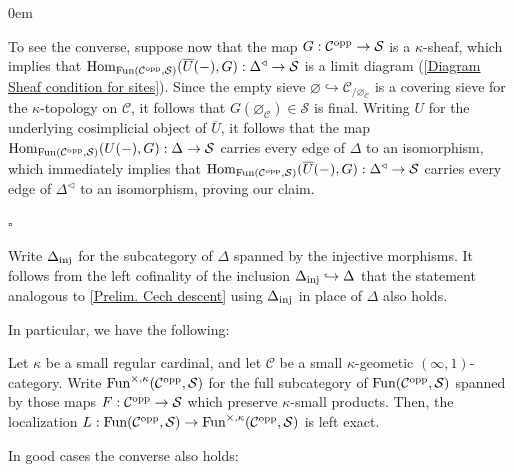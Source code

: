 \documentclass[10pt]{article}
\newcommand{\mS}{\mathcal S}
\newcommand{\C}{\mathcal C}
\renewcommand{\qed}{\hfill$\square$}
\renewenvironment{proof}{\begin{addmargin}[1em]{0em}\begin{newproof}}{\end{newproof}\end{addmargin}\qed}
\theoremstyle{witharg}
\theoremstyle{witharg}
\theoremstyle{witharg2}
\begin{document}
\begin{proof}
To see the converse, suppose now that the map $G:\C^{\textnormal{opp}}\rightarrow \mS$ is a $\kappa$-sheaf, which implies that $\textnormal{Hom}_{\textnormal{Fun}(\C^{\textnormal{opp}},\mS)}(\overline{U}(-),G):\Delta^\triangleleft\rightarrow \mS$ is a limit diagram (\ref{Diagram Sheaf condition for sites}). Since the empty sieve $\varnothing\hookrightarrow \C_{/\varnothing_\C}$ is a covering sieve for the $\kappa$-topology on $\C$, it follows that $G(\varnothing_\C)\in \mS$ is final. Writing $U$ for the underlying cosimplicial object of $\overline{U}$, it follows that the map $\textnormal{Hom}_{\textnormal{Fun}(\C^{\textnormal{opp}},\mS)}(U(-),G):\Delta\rightarrow \mS$ carries every edge of $\Delta$ to an isomorphism, which immediately implies that $\textnormal{Hom}_{\textnormal{Fun}(\C^{\textnormal{opp}},\mS)}(\overline{U}(-),G):\Delta^\triangleleft\rightarrow \mS$ carries every edge of $\Delta^\triangleleft$ to an isomorphism, proving our claim.

\end{proof}


\begin{remark}{}

    Write $\Delta_{\textnormal{inj}}$ for the subcategory of $\Delta$ spanned by the injective morphisms. It follows from the left cofinality of the inclusion $\Delta_{\textnormal{inj}}\hookrightarrow \Delta$ that the statement analogous to \ref{Prelim. Cech descent} using $\Delta_{\textnormal{inj}}$ in place of $\Delta$ also holds. 
    
\end{remark}

\noindent In particular, we have the following: 


\begin{corollary}{}\label{Left Exact Localization for kappa Topology}

    Let $\kappa$ be a small regular cardinal, and let $\C$ be a small $\kappa$-geometic $(\infty,1)$-category. Write $\textnormal{Fun}^{\times,\kappa}(\C^{\textnormal{opp}},\mS)$ for the full subcategory of $\textnormal{Fun}(\C^{\textnormal{opp}},\mS)$ spanned by those maps $F:\C^{\textnormal{opp}}\rightarrow \mS$ which preserve $\kappa$-small products. Then, the localization $L:\textnormal{Fun}(\C^{\textnormal{opp}},\mS)\rightarrow \textnormal{Fun}^{\times,\kappa}(\C^{\textnormal{opp}},\mS)$ is left exact. 

\end{corollary}


\noindent In good cases the converse also holds:
\end{document}
